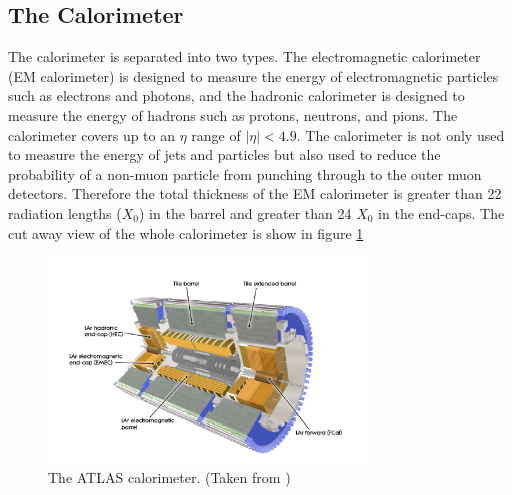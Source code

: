 \subsection{The Calorimeter}
\label{LHC:Calorimeter}
\indent The calorimeter is separated into two types. The electromagnetic calorimeter (EM calorimeter) is designed to measure the energy of electromagnetic particles such as electrons and photons, and the hadronic calorimeter is designed to measure the energy of hadrons such as protons, neutrons, and pions. The calorimeter covers up to an $\eta$ range of $|\eta| < 4.9$. The calorimeter is not only used to measure the energy of jets and particles but also used to reduce the probability of a non-muon particle from punching through to the outer muon detectors. Therefore the total thickness of the EM calorimeter is greater than 22 radiation lengths ($X_0$) in the barrel and greater than 24 $X_0$ in the end-caps.\cite{biblio:JINST} The cut away view of the whole calorimeter is show in figure \ref{LHC:fig:ATLASCalo} ~\\
\begin{figure}[h!]
\centering
\includegraphics[width=0.75\textwidth, angle=0]{figures/DET/ATLAS_Calo.PNG}
\caption{ The ATLAS calorimeter. (Taken from \cite{biblio:JINST}) \label{LHC:fig:ATLASCalo}}
\end{figure}

